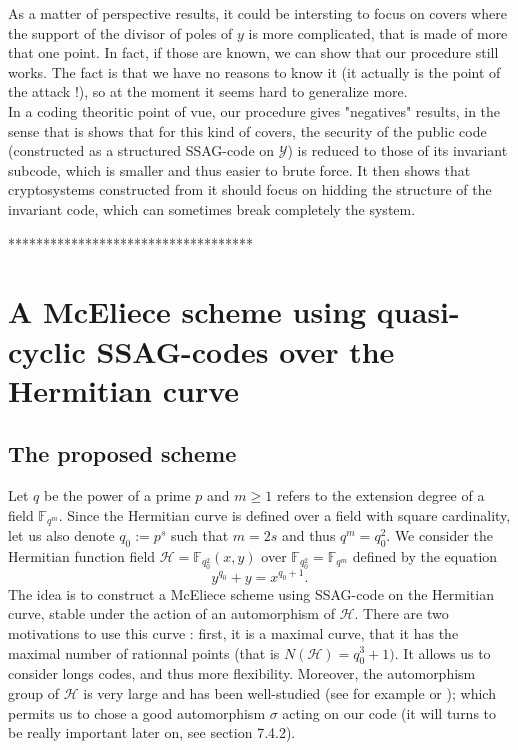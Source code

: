 \documentclass[10pt]{article}
\newcommand{\s}{\vspace{0.3cm}}
\newcommand{\fqm}{\mathbb{F}_{q^m}}
\newcommand{\Y}{\mathcal{Y}}
\begin{document}
As a matter of perspective results, it could be intersting to focus on covers where the support of the divisor of poles of $y$ is more complicated, that is made of more that one point. In fact, if those are known, we can show that our procedure still works. The fact is that we have no reasons to know it (it actually is the point of the attack !), so at the moment it seems hard to generalize more. \\
In a coding theoritic point of vue, our procedure gives "negatives" results, in the sense that is shows that for this kind of covers, the security of the public code (constructed as a structured SSAG-code on $\Y$) is reduced to those of its invariant subcode, which is smaller and thus easier to brute force. It then shows that cryptosystems constructed from it should focus on hidding the structure of the invariant code, which can sometimes break completely the system.

\s

***********************************


\newpage

\section{A McEliece scheme using quasi-cyclic SSAG-codes over the Hermitian curve}

\s

\subsection{The proposed scheme}

\s

Let $q$ be the power of a prime $p$ and $m \geq 1$ refers to the extension degree of a field $\fqm$. Since the Hermitian curve is defined over a field with square cardinality, let us also denote $q_0:=p^s$ such that $m=2s$ and thus $q^m = q_0^2$. We consider the Hermitian function field $\mathcal{H} = \mathbb{F}_{q_0^2}(x,y)$ over $\mathbb{F}_{q_0^2}=\fqm$ defined by the equation
\[y^{q_0}+y=x^{q_0+1}.\]
The idea is to construct a McEliece scheme using SSAG-code on the Hermitian curve, stable under the action of an automorphism of $\mathcal{H}$. There are two motivations to use this curve : first, it is a maximal curve, that it has the maximal number of rationnal points (that is $N(\mathcal{H})=q_0^3+1)$. It allows us to consider longs codes, and thus more flexibility. Moreover, the automorphism group of $\mathcal{H}$ is very large and has been well-studied (see for example \cite{Sti} or \cite{Gar}); which permits us to chose a good automorphism $\sigma$ acting on our code (it will turns to be really important later on, see section 7.4.2). 
\end{document}
